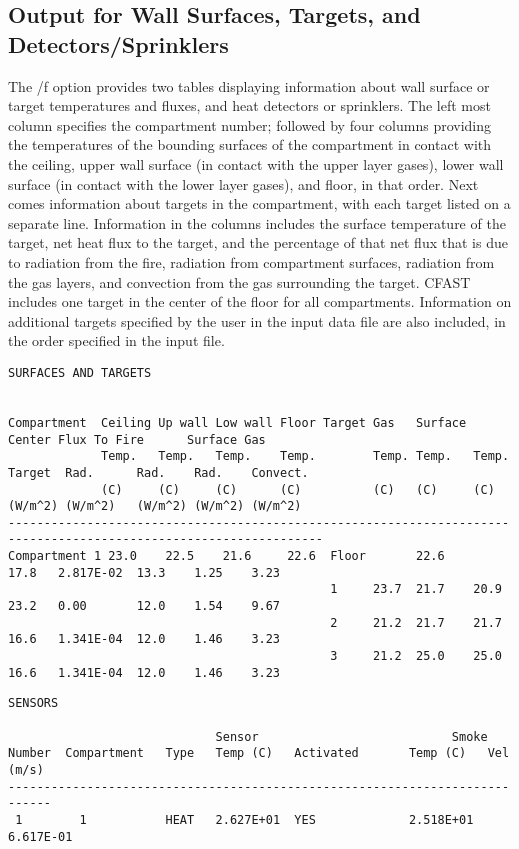 \subsection{Output for Wall Surfaces, Targets, and Detectors/Sprinklers}

The /f option provides two tables displaying information about wall surface or target temperatures and fluxes, and heat detectors or sprinklers. The left most column specifies the compartment number; followed by four columns providing the temperatures of the bounding surfaces of the compartment in contact with the ceiling, upper wall surface (in contact with the upper layer gases), lower wall surface (in contact with the lower layer gases), and floor, in that order. Next comes information about targets in the compartment, with each target listed on a separate line.  Information in the columns includes the surface temperature of the target, net heat flux to the target, and the percentage of that net flux that is due to radiation from the fire, radiation from compartment surfaces, radiation from the gas layers, and convection from the gas surrounding the target.  CFAST includes one target in the center of the floor for all compartments. Information on additional targets specified by the user in the input data file are also included, in the order specified in the input file.

\begin{lstlisting}[basicstyle=\tiny]
SURFACES AND TARGETS


Compartment  Ceiling Up wall Low wall Floor Target Gas   Surface Center Flux To Fire      Surface Gas
             Temp.   Temp.   Temp.    Temp.        Temp. Temp.   Temp.  Target  Rad.      Rad.    Rad.    Convect.
             (C)     (C)     (C)      (C)          (C)   (C)     (C)    (W/m^2) (W/m^2)   (W/m^2) (W/m^2) (W/m^2)
------------------------------------------------------------------------------------------------------------------
Compartment 1 23.0    22.5    21.6     22.6  Floor       22.6            17.8   2.817E-02  13.3    1.25    3.23
                                             1     23.7  21.7    20.9    23.2   0.00       12.0    1.54    9.67
                                             2     21.2  21.7    21.7    16.6   1.341E-04  12.0    1.46    3.23
                                             3     21.2  25.0    25.0    16.6   1.341E-04  12.0    1.46    3.23
\end{lstlisting}
\newpage
\begin{lstlisting}[basicstyle=\tiny]
SENSORS

                             Sensor                           Smoke
Number  Compartment   Type   Temp (C)   Activated       Temp (C)   Vel (m/s)
----------------------------------------------------------------------------
 1        1           HEAT   2.627E+01  YES             2.518E+01  6.617E-01
 \end{lstlisting}

